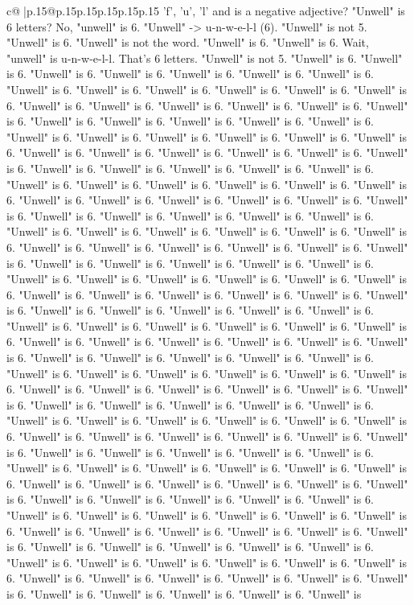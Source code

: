 \documentclass{article}
\begin{document}
{\begin{supertabular}{c@{$\;$}|p{.15\linewidth}@{}p{.15\linewidth}p{.15\linewidth}p{.15\linewidth}p{.15\linewidth}p{.15\linewidth}}
{{{'f', 'u', 'l' and is a negative adjective? "Unwell" is 6 letters? No, "unwell" is 6. "Unwell" {-}> u{-}n{-}w{-}e{-}l{-}l (6). "Unwell" is not 5. "Unwell" is 6. "Unwell" is not the word. "Unwell" is 6. "Unwell" is 6. Wait, "unwell" is u{-}n{-}w{-}e{-}l{-}l. That's 6 letters. "Unwell" is not 5. "Unwell" is 6. "Unwell" is 6. "Unwell" is 6. "Unwell" is 6. "Unwell" is 6. "Unwell" is 6. "Unwell" is 6. "Unwell" is 6. "Unwell" is 6. "Unwell" is 6. "Unwell" is 6. "Unwell" is 6. "Unwell" is 6. "Unwell" is 6. "Unwell" is 6. "Unwell" is 6. "Unwell" is 6. "Unwell" is 6. "Unwell" is 6. "Unwell" is 6. "Unwell" is 6. "Unwell" is 6. "Unwell" is 6. "Unwell" is 6. "Unwell" is 6. "Unwell" is 6. "Unwell" is 6. "Unwell" is 6. "Unwell" is 6. "Unwell" is 6. "Unwell" is 6. "Unwell" is 6. "Unwell" is 6. "Unwell" is 6. "Unwell" is 6. "Unwell" is 6. "Unwell" is 6. "Unwell" is 6. "Unwell" is 6. "Unwell" is 6. "Unwell" is 6. "Unwell" is 6. "Unwell" is 6. "Unwell" is 6. "Unwell" is 6. "Unwell" is 6. "Unwell" is 6. "Unwell" is 6. "Unwell" is 6. "Unwell" is 6. "Unwell" is 6. "Unwell" is 6. "Unwell" is 6. "Unwell" is 6. "Unwell" is 6. "Unwell" is 6. "Unwell" is 6. "Unwell" is 6. "Unwell" is 6. "Unwell" is 6. "Unwell" is 6. "Unwell" is 6. "Unwell" is 6. "Unwell" is 6. "Unwell" is 6. "Unwell" is 6. "Unwell" is 6. "Unwell" is 6. "Unwell" is 6. "Unwell" is 6. "Unwell" is 6. "Unwell" is 6. "Unwell" is 6. "Unwell" is 6. "Unwell" is 6. "Unwell" is 6. "Unwell" is 6. "Unwell" is 6. "Unwell" is 6. "Unwell" is 6. "Unwell" is 6. "Unwell" is 6. "Unwell" is 6. "Unwell" is 6. "Unwell" is 6. "Unwell" is 6. "Unwell" is 6. "Unwell" is 6. "Unwell" is 6. "Unwell" is 6. "Unwell" is 6. "Unwell" is 6. "Unwell" is 6. "Unwell" is 6. "Unwell" is 6. "Unwell" is 6. "Unwell" is 6. "Unwell" is 6. "Unwell" is 6. "Unwell" is 6. "Unwell" is 6. "Unwell" is 6. "Unwell" is 6. "Unwell" is 6. "Unwell" is 6. "Unwell" is 6. "Unwell" is 6. "Unwell" is 6. "Unwell" is 6. "Unwell" is 6. "Unwell" is 6. "Unwell" is 6. "Unwell" is 6. "Unwell" is 6. "Unwell" is 6. "Unwell" is 6. "Unwell" is 6. "Unwell" is 6. "Unwell" is 6. "Unwell" is 6. "Unwell" is 6. "Unwell" is 6. "Unwell" is 6. "Unwell" is 6. "Unwell" is 6. "Unwell" is 6. "Unwell" is 6. "Unwell" is 6. "Unwell" is 6. "Unwell" is 6. "Unwell" is 6. "Unwell" is 6. "Unwell" is 6. "Unwell" is 6. "Unwell" is 6. "Unwell" is 6. "Unwell" is 6. "Unwell" is 6. "Unwell" is 6. "Unwell" is 6. "Unwell" is 6. "Unwell" is 6. "Unwell" is 6. "Unwell" is 6. "Unwell" is 6. "Unwell" is 6. "Unwell" is 6. "Unwell" is 6. "Unwell" is 6. "Unwell" is 6. "Unwell" is 6. "Unwell" is 6. "Unwell" is 6. "Unwell" is 6. "Unwell" is 6. "Unwell" is 6. "Unwell" is 6. "Unwell" is 6. "Unwell" is 6. "Unwell" is 6. "Unwell" is 6. "Unwell" is 6. "Unwell" is 6. "Unwell" is 6. "Unwell" is 6. "Unwell" is 6. "Unwell" is 6. "Unwell" is 6. "Unwell" is 6. "Unwell" is 6. "Unwell" is 6. "Unwell" is 6. "Unwell" is 6. "Unwell" is 6. "Unwell" is 6. "Unwell" is 6. "Unwell" is 6. "Unwell" is 6. "Unwell" is 6. "Unwell" is 6. "Unwell" is 6. "Unwell" is 6. "Unwell" is 6. "Unwell" is 6. "Unwell" is 6. "Unwell" is 6. "Unwell" is 6. "Unwell" is 6. "Unwell" is 6. "Unwell" is 6. "Unwell" is 6. "Unwell" is 6. "Unwell" is 6. "Unwell" is }}}
\end{supertabular}}
\end{document}
